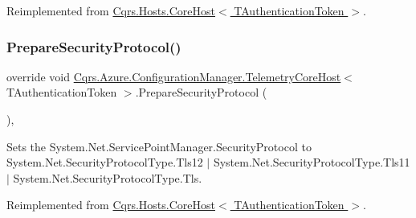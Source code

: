 Reimplemented from \hyperlink{classCqrs_1_1Hosts_1_1CoreHost_aa01932c1199967babe19c3059e86f513_aa01932c1199967babe19c3059e86f513}{Cqrs.\+Hosts.\+Core\+Host$<$ T\+Authentication\+Token $>$}.

\mbox{\label{classCqrs_1_1Azure_1_1ConfigurationManager_1_1TelemetryCoreHost_a0e920d0139b12319847f8ec1deb12f3b_a0e920d0139b12319847f8ec1deb12f3b}} 
\subsubsection{\texorpdfstring{Prepare\+Security\+Protocol()}{PrepareSecurityProtocol()}}
{\footnotesize\ttfamily override void \hyperlink{classCqrs_1_1Azure_1_1ConfigurationManager_1_1TelemetryCoreHost}{Cqrs.\+Azure.\+Configuration\+Manager.\+Telemetry\+Core\+Host}$<$ T\+Authentication\+Token $>$.Prepare\+Security\+Protocol (\begin{DoxyParamCaption}{ }\end{DoxyParamCaption})\hspace{0.3cm}{\ttfamily [protected]}, {\ttfamily [virtual]}}



Sets the System.\+Net.\+Service\+Point\+Manager.\+Security\+Protocol to System.\+Net.\+Security\+Protocol\+Type.\+Tls12 $\vert$ System.\+Net.\+Security\+Protocol\+Type.\+Tls11 $\vert$ System.\+Net.\+Security\+Protocol\+Type.\+Tls. 



Reimplemented from \hyperlink{classCqrs_1_1Hosts_1_1CoreHost_a220ba43ac810c074c8881e8f598ff746_a220ba43ac810c074c8881e8f598ff746}{Cqrs.\+Hosts.\+Core\+Host$<$ T\+Authentication\+Token $>$}.

\mbox{\label{classCqrs_1_1Azure_1_1ConfigurationManager_1_1TelemetryCoreHost_a1d7406fe5dd09d6d6e449522a0a2f637_a1d7406fe5dd09d6d6e449522a0a2f637}} 
